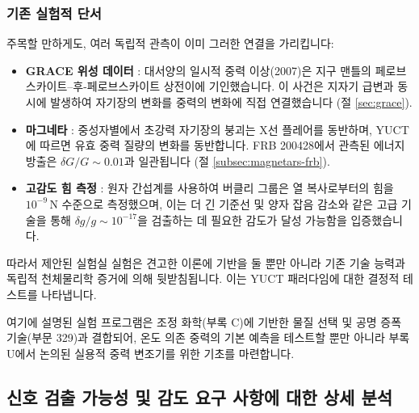 \documentclass[11pt,a4paper]{article}
\begin{document}
	\subsubsection{기존 실험적 단서}
	주목할 만하게도, 여러 독립적 관측이 이미 그러한 연결을 가리킵니다:
	\begin{itemize}
		\item \textbf{GRACE 위성 데이터} \cite{Rosat2025}: 대서양의 일시적 중력 이상(2007)은 지구 맨틀의 페로브스카이트–후-페로브스카이트 상전이에 기인했습니다. 이 사건은 지자기 급변과 동시에 발생하여 자기장의 변화를 중력의 변화에 직접 연결했습니다 (절 \ref{sec:grace}).
		\item \textbf{마그네타} \cite{Kaspi2017}: 중성자별에서 초강력 자기장의 붕괴는 X선 플레어를 동반하며, YUCT에 따르면 유효 중력 질량의 변화를 동반합니다. FRB 200428에서 관측된 에너지 방출은 $\delta G/G \sim 0.01$과 일관됩니다 (절 \ref{subsec:magnetars-frb}).
		\item \textbf{고감도 힘 측정} \cite{Muller2017}: 원자 간섭계를 사용하여 버클리 그룹은 열 복사로부터의 힘을 $10^{-9}\,\mathrm{N}$ 수준으로 측정했으며, 이는 더 긴 기준선 및 양자 잡음 감소와 같은 고급 기술을 통해 $\delta g/g \sim 10^{-17}$을 검출하는 데 필요한 감도가 달성 가능함을 입증했습니다.
	\end{itemize}
	
	따라서 제안된 실험실 실험은 견고한 이론에 기반을 둘 뿐만 아니라 기존 기술 능력과 독립적 천체물리학 증거에 의해 뒷받침됩니다. 이는 YUCT 패러다임에 대한 결정적 테스트를 나타냅니다.
	
	여기에 설명된 실험 프로그램은 조정 화학(부록 C)에 기반한 물질 선택 및 공명 증폭 기술(부문 329)과 결합되어, 온도 의존 중력의 기본 예측을 테스트할 뿐만 아니라 부록 U에서 논의된 실용적 중력 변조기를 위한 기초를 마련합니다.
	
	\subsection{신호 검출 가능성 및 감도 요구 사항에 대한 상세 분석}
	\label{subsec:signal-detectability}
	
\end{document}
